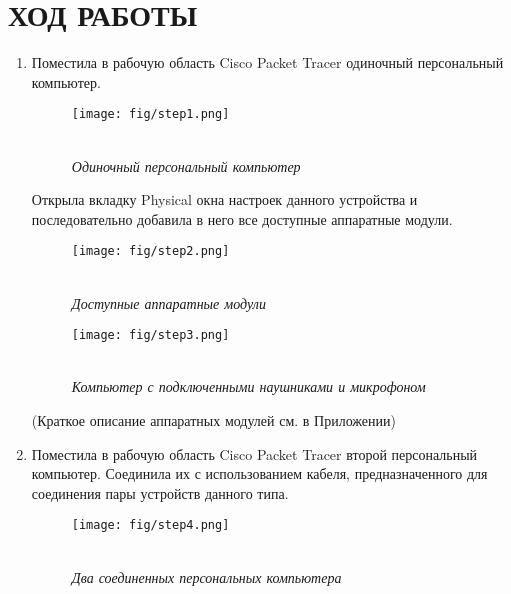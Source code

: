 \section*{ХОД РАБОТЫ}

\begin{enumerate}
\item Поместила в рабочую область Cisco Packet Tracer одиночный
персональный компьютер. 
  \begin{figure}[htbp]
    \centering
    \texttt{[image: fig/step1.png]}
    \caption*{\\[-35 pt] \it Одиночный персональный компьютер}
  \end{figure}
Открыла вкладку Physical окна настроек данного
устройства и последовательно добавила в него все доступные аппаратные
модули. 
\begin{figure}[h!]
\begin{multicols}{2}
\hfill
\texttt{[image: fig/step2.png]}
\hfill
\caption*{\\[-35 pt] \it Доступные аппаратные модули}
\label{figLeft}
\hfill
\texttt{[image: fig/step3.png]}
\hfill
\caption*{\\[-35 pt] \it Компьютер с подключенными наушниками и микрофоном}
\label{figRight}
\end{multicols}
\end{figure}
  
 (Краткое описание аппаратных модулей см. в Приложении)

\item Поместила в рабочую область Cisco Packet Tracer второй
персональный компьютер. Соединила их с использованием кабеля,
предназначенного для соединения пары устройств данного типа. 
  \begin{figure}[htbp]
    \centering
    \texttt{[image: fig/step4.png]}
    \caption*{\\[-35 pt] \it Два соединенных персональных компьютера}
  \end{figure}
  

\end{enumerate}
